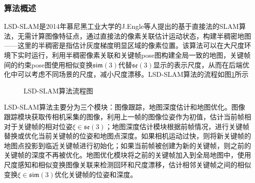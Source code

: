 \subsubsection*{算法概述}
LSD-SLAM是2014年慕尼黑工业大学的J.Engle等人提出的基于直接法的SLAM算法，无需计算图像特征点，通过直接法的像素关联估计运动状态，构建半稠密地图——这里的半稠密是指估计灰度梯度明显区域的像素位置。该算法可以在大尺度环境下实时运行，利用半稠密像素关联和关键帧pose图构建全局一致的地图，关键帧间的约束pose图使用相似变换$\mathfrak{sim}(3)$代替$\mathfrak{se}(3)$显示的表示尺度，从而在后端优化中可以考虑不同场景的尺度，减小尺度漂移。LSD-SLAM算法的流程如图\ref{fig3.4}所示
\begin{figure}
\centering
\caption{LSD-SLAM算法流程图}
\label{fig3.4}
\end{figure}

LSD-SLAM算法主要分为三个模块：图像跟踪，地图深度估计和地图优化。图像跟踪模块获取传相机采集的图像，利用上一帧的图像位姿作为初值，估计当前帧相对于关键帧的相对位姿$\xi \in \mathfrak{se}(3) $；地图深度估计模块根据前帧情况，进行关键帧替换或优化当前关键帧的位姿和地图点深度。如果相机运动过快，则将新关键帧的地图点投影到临近关键帧进行初始化；如果当前帧被创建为新的关键帧，则之前的关键帧的深度不再被优化。地图优化模块将之前的关键帧加入到全局地图中，使用尺度感知和相似变换图像关联来检测回环和尺度漂移，估计相邻关键帧之间的相似变换$\xi \in \mathfrak{sim}(3)$优化关键帧的位姿和深度。


